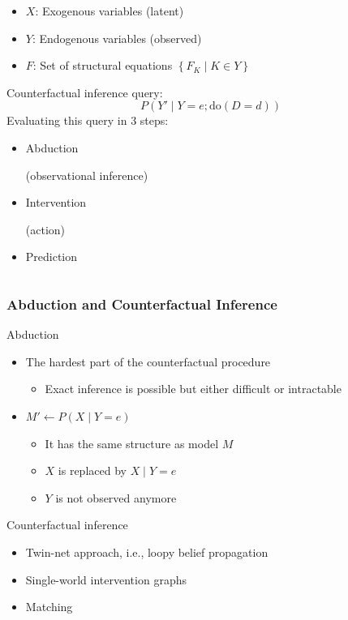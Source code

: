\documentclass[usenames,dvipsnames]{beamer}
\begin{document}
\begin{frame}
\begin{columns}
\begin{column}[t]{.50\textwidth}
\begin{itemize}
        \item $X$: Exogenous variables (latent)
        \item $Y$: Endogenous variables (observed)
        \item $F$: Set of structural equations $\left\{F_{K} \mid K \in Y\right\}$
      \end{itemize}
      \vspace{0.2cm}
      Counterfactual inference query:\vspace{-0.2cm}
      \[
        P(Y' \mid Y = e; \text{do}(D = d))
      \]
      Evaluating this query in 3 steps:
      \begin{itemize}
        \item Abduction \begin{tiny}(observational inference)\end{tiny}
        \item Intervention \begin{tiny}(action)\end{tiny}
        \item Prediction
      \end{itemize}
    \end{column}
  \end{columns}
\end{frame}
\begin{frame}
  \frametitle{Abduction and Counterfactual Inference}
  Abduction
  \begin{itemize}
    \item The hardest part of the counterfactual procedure
      \begin{itemize}
        \item Exact inference is possible but either difficult or intractable
      \end{itemize}
    \item $M' \leftarrow P(X \mid Y=e)$
      \begin{itemize}
        \item It has the same structure as model $M$
        \item $X$ is replaced by $X \mid Y=e$
        \item $Y$ is not observed anymore
      \end{itemize}
  \end{itemize}
  Counterfactual inference
  \begin{itemize}
    \item Twin-net approach, i.e., loopy belief propagation \parencite{Balke1994}
    \item Single-world intervention graphs \parencite{Richardson2013}
    \item Matching \parencite{Li2012}
  \end{itemize}
\end{frame}
\end{document}
